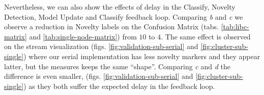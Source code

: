 Nevertheless, we can also show the effects of delay in the
Classify, Novelty Detection, Model Update and Classify feedback loop.
Comparing \emph{b} and \emph{c} we observe a reduction in Novelty labels
on the Confusion Matrix (tabs. \ref{tab:libc-matrix} and \ref{tab:single-node-matrix})
from $10$ to $4$.
The same effect is observed on the stream visualization (figs.
\ref{fig:validation-sub-serial} and \ref{fig:cluster-sub-single}) where our
serial implementation has less novelty markers and they appear latter, but the
measures keeps the same ``shape''.
Comparing \emph{c} and \emph{d} the difference is even smaller,
(figs. \ref{fig:validation-sub-serial} and \ref{fig:cluster-sub-single})
as they both suffer the expected delay in the feedback loop.



%     
%     


%   

